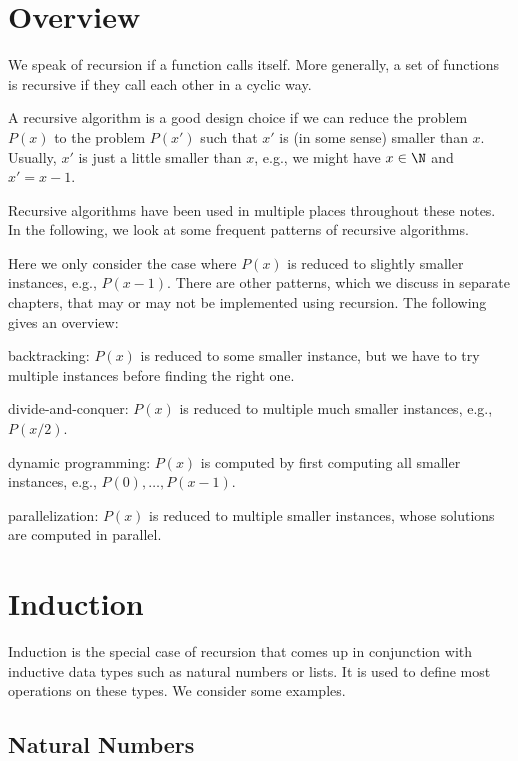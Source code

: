 \section{Overview}

We speak of recursion if a function calls itself.
More generally, a set of functions is recursive if they call each other in a cyclic way.

A recursive algorithm is a good design choice if we can reduce the problem $P(x)$ to the problem $P(x')$ such that $x'$ is (in some sense) smaller than $x$.
Usually, $x'$ is just a little smaller than $x$, e.g., we might have $x\in\N$ and $x'=x-1$.

Recursive algorithms have been used in multiple places throughout these notes.
In the following, we look at some frequent patterns of recursive algorithms.

Here we only consider the case where $P(x)$ is reduced to slightly smaller instances, e.g., $P(x-1)$.
There are other patterns, which we discuss in separate chapters, that may or may not be implemented using recursion.
The following gives an overview:
\begin{compactitem}
  \item backtracking: $P(x)$ is reduced to some smaller instance, but we have to try multiple instances before finding the right one.
  \item divide-and-conquer: $P(x)$ is reduced to multiple much smaller instances, e.g., $P(x/2)$.
  \item dynamic programming: $P(x)$ is computed by first computing all smaller instances, e.g., $P(0),\ldots,P(x-1)$.
  \item parallelization: $P(x)$ is reduced to multiple smaller instances, whose solutions are computed in parallel.
\end{compactitem}

\section{Induction}

Induction is the special case of recursion that comes up in conjunction with inductive data types such as natural numbers or lists.
It is used to define most operations on these types.
We consider some examples.

\subsection{Natural Numbers}

